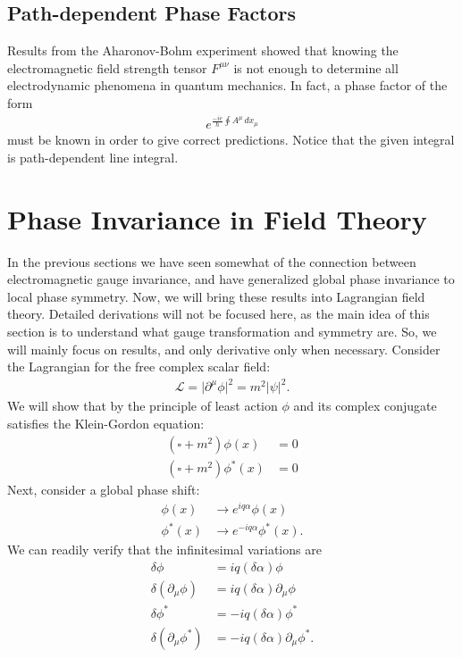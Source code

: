 \documentclass{book}
\numberwithin{equation}{section}
\theoremstyle{definition}
\newcommand{\p}{\partial}
\newcommand{\lag}{\mathcal{L}}
\begin{document}
\subsection{Path-dependent Phase Factors}
Results from the Aharonov-Bohm experiment showed that knowing the electromagnetic field strength tensor $F^{\mu\nu}$ is not enough to determine all electrodynamic phenomena in quantum mechanics. In fact, a phase factor of the form
\begin{align}
e^{\frac{-ie}{\hbar}\oint A^\mu\,dx_\mu}
\end{align}
must be known in order to give correct predictions. Notice that the given integral is path-dependent line integral. 

\section{Phase Invariance in Field Theory}
In the previous sections we have seen somewhat of the connection between electromagnetic gauge invariance, and have generalized global phase invariance to local phase symmetry. Now, we will bring these results into Lagrangian field theory. Detailed derivations will not be focused here, as the main idea of this section is to understand what gauge transformation and symmetry are. So, we will mainly focus on results, and only derivative only when necessary. Consider the Lagrangian for the free complex scalar field: 
\begin{align}
\lag = \vert \p^\mu \phi \vert^2 = m^2\vert \psi \vert^2.
\end{align}
We will show that by the principle of least action $\phi$ and its complex conjugate satisfies the Klein-Gordon equation:
\begin{align}
(\square + m^2)\phi(x) &= 0\\
(\square + m^2)\phi^*(x) &= 0
\end{align}
Next, consider a global phase shift:
\begin{align}
\phi(x)&\to e^{iq\alpha}\phi(x)\\
\phi^*(x) &\to e^{-iq\alpha}\phi^*(x).
\end{align}
We can readily verify that the infinitesimal variations are
\begin{align}
\delta \phi &= iq(\delta \alpha)\phi\\
\delta(\p_\mu\phi) &= iq(\delta \alpha)\p_\mu\phi\\
\delta \phi^* &= -iq(\delta \alpha)\phi^*\\
\delta(\p_\mu\phi^*) &= -iq(\delta \alpha)\p_\mu\phi^*.
\end{align}
\end{document}
